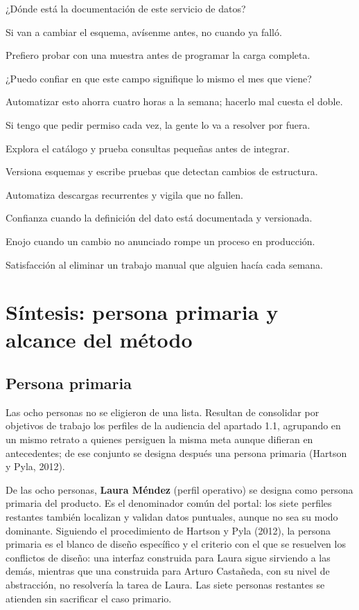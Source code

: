   {\item ¿Dónde está la documentación de este servicio de datos?
   \item Si van a cambiar el esquema, avísenme antes, no cuando ya falló.
   \item Prefiero probar con una muestra antes de programar la carga completa.}
  {\item ¿Puedo confiar en que este campo signifique lo mismo el mes que viene?
   \item Automatizar esto ahorra cuatro horas a la semana; hacerlo mal cuesta el doble.
   \item Si tengo que pedir permiso cada vez, la gente lo va a resolver por fuera.}
  {\item Explora el catálogo y prueba consultas pequeñas antes de integrar.
   \item Versiona esquemas y escribe pruebas que detectan cambios de estructura.
   \item Automatiza descargas recurrentes y vigila que no fallen.}
  {\item Confianza cuando la definición del dato está documentada y versionada.
   \item Enojo cuando un cambio no anunciado rompe un proceso en producción.
   \item Satisfacción al eliminar un trabajo manual que alguien hacía cada semana.}

\section{Síntesis: persona primaria y alcance del método}

\subsection{Persona primaria}

Las ocho personas no se eligieron de una lista. Resultan de consolidar por objetivos de
trabajo los perfiles de la audiencia del apartado 1.1, agrupando en un mismo retrato a quienes
persiguen la misma meta aunque difieran en antecedentes; de ese conjunto se designa después
una persona primaria (Hartson y Pyla, 2012).

\begin{uxdestacado}
De las ocho personas, \textbf{\textcolor{uxnavy}{Laura Méndez}} (perfil operativo) se designa
como persona primaria del producto. Es el denominador común del portal: los siete perfiles
restantes también localizan y validan datos puntuales, aunque no sea su modo dominante.
Siguiendo el procedimiento de Hartson y Pyla (2012), la persona primaria es el blanco de
diseño específico y el criterio con el que se resuelven los conflictos de diseño: una interfaz
construida para Laura sigue sirviendo a las demás, mientras que una construida para Arturo
Castañeda, con su nivel de abstracción, no resolvería la tarea de Laura. Las siete personas
restantes se atienden sin sacrificar el caso primario.
\end{uxdestacado}

